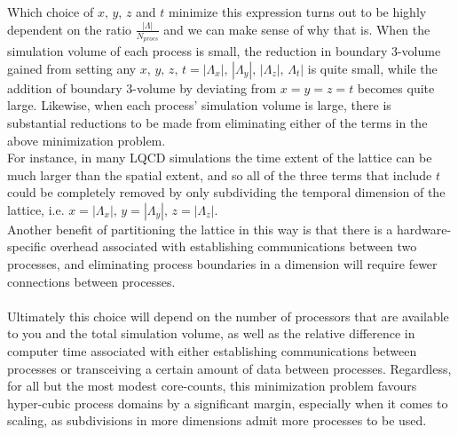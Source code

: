 \documentclass[a4paper,10pt]{article}
\begin{document}
Which choice of $x,\,y,\,z$ and $t$ minimize this expression turns out to be highly dependent on the ratio $\frac{|\Lambda|}{N_{procs}}$ and we can make sense of why that is. When the simulation volume of each process is small, the reduction in boundary 3-volume gained from setting any $x,\,y,\,z,\,t = |\Lambda_x|,\,|\Lambda_y|,\,|\Lambda_z|,\,\Lambda_t|$ is quite small, while the addition of boundary 3-volume by deviating from $x=y=z=t$ becomes quite large. Likewise, when each process' simulation volume is large, there is substantial reductions to be made from eliminating either of the terms in the above minimization problem.\\For instance, in many LQCD simulations the time extent of the lattice can be much larger than the spatial extent, and so all of the three terms that include $t$ could be completely removed by only subdividing the temporal dimension of the lattice, i.e. $x=|\Lambda_x|,\,y=|\Lambda_y|,\,z=|\Lambda_z|$.\\Another benefit of partitioning the lattice in this way is that there is a hardware-specific overhead associated with establishing communications between two processes, and eliminating process boundaries in a dimension will require fewer connections between processes.\\\\Ultimately this choice will depend on the number of processors that are available to you and the total simulation volume, as well as the relative difference in computer time associated with either establishing communications between processes or transceiving a certain amount of data between processes. Regardless, for all but the most modest core-counts, this minimization problem favours hyper-cubic process domains by a significant margin, especially when it comes to scaling, as subdivisions in more dimensions admit more processes to be used.
\end{document}

